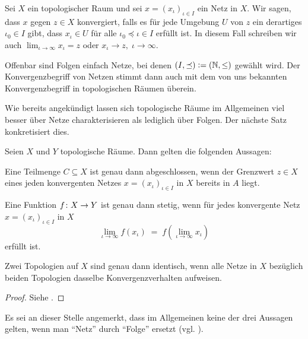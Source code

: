 \documentclass[../main/main.tex]{subfiles}
\begin{document}
	\begin{Definition}
		Sei $X$ ein topologischer Raum und sei $x = (x_\iota)_{\iota \in I}$ ein Netz in $X$. Wir sagen, dass $x$ gegen $z \in X$ konvergiert, falls
		es für jede Umgebung $U$ von $z$ ein derartiges $\iota_0 \in I$ gibt, dass $x_\iota \in U$ für alle $\iota_0 \preceq \iota \in I$ erfüllt ist.
		In diesem Fall schreiben wir auch $\lim_{\iota \to \infty} x_\iota = z$ oder $x_\iota \to z, \; \iota \to \infty$.
	\end{Definition}
	
	\begin{Bemerkung}
		Offenbar sind Folgen einfach Netze, bei denen $(I, \preceq) \vcentcolon = (\mathbb{N}, \leq)$ gewählt wird. Der Konvergenzbegriff von Netzen stimmt
		dann auch mit dem von uns bekannten Konvergenzbegriff in topologischen Räumen überein.
	\end{Bemerkung}
	
	Wie bereits angekündigt lassen sich topologische Räume im Allgemeinen viel besser über Netze charakterisieren als lediglich über Folgen. Der nächste Satz
	konkretisiert dies.
	
	\begin{Satz}
		\label{thm:netconvergence}
		Seien $X$ und $Y$ topologische Räume. Dann gelten die folgenden Aussagen:
		\begin{enumeratethm}
			\item Eine Teilmenge $C \subseteq X$ ist genau dann abgeschlossen, wenn der Grenzwert $z \in X$ eines jeden konvergenten Netzes 
			$x = (x_\iota)_{\iota \in I}$ in $X$ bereits in $A$ liegt.
			\item Eine Funktion $f \colon X \to Y$ ist genau dann stetig, wenn für jedes konvergente Netz $x = (x_\iota)_{\iota \in I}$ in $X$ 
			\[ \lim_{\iota \to \infty} f(x_\iota) \; = \; f(\lim_{\iota \to \infty} x_\iota) \]
			erfüllt ist.
			\item Zwei Topologien auf $X$ sind genau dann identisch, wenn alle Netze in $X$ bezüglich beiden Topologien dasselbe Konvergenzverhalten aufweisen.
		\end{enumeratethm}
	\end{Satz}
	
	\begin{proof}
		Siehe \cite[Satz 2.6.3]{Simon.2015}.
	\end{proof}
	
	\begin{Bemerkung}
		Es sei an dieser Stelle angemerkt, dass im Allgemeinen keine der drei Aussagen gelten, wenn man \enquote{Netz} durch \enquote{Folge} ersetzt 
		(vgl. \cite[Beispiel 2.6.1]{Simon.2015}).
	\end{Bemerkung}
	
\end{document}
